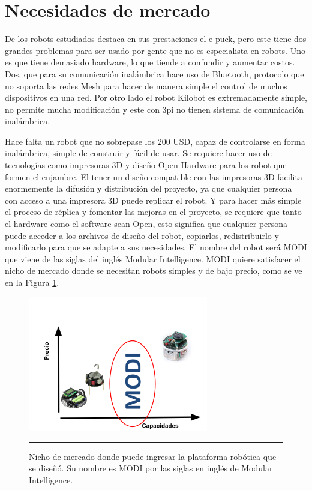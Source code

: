 \section{Necesidades de mercado}

De los robots estudiados destaca en sus prestaciones el e-puck, pero este tiene dos grandes problemas para ser usado por gente que no es especialista en robots. Uno es que tiene demasiado hardware, lo que tiende a confundir y aumentar costos. Dos, que para su comunicación inalámbrica hace uso de Bluetooth, protocolo que no soporta las redes Mesh para hacer de manera simple el control de muchos dispositivos en una red. Por otro lado el robot Kilobot es extremadamente simple, no permite mucha modificación y este con 3pi no tienen sistema de comunicación inalámbrica.

Hace falta un robot que no sobrepase los 200 USD, capaz de controlarse en forma inalámbrica, simple de construir y fácil de usar. Se requiere hacer uso de tecnologías como impresoras 3D y diseño Open Hardware para los robot que formen el enjambre. El tener un diseño compatible con las impresoras 3D facilita enormemente la difusión y distribución del proyecto, ya que cualquier persona con acceso a una impresora 3D puede replicar el robot. Y para hacer más simple el proceso de réplica y fomentar las mejoras en el proyecto, se requiere que tanto el hardware como el software sean Open, esto significa que cualquier persona puede acceder a los archivos de diseño del robot, copiarlos, redistribuirlo y modificarlo para que se adapte a sus necesidades. El nombre del robot será MODI que viene de las siglas del inglés Modular Intelligence. MODI quiere satisfacer el nicho de mercado donde se necesitan robots simples y de bajo precio, como se ve en la Figura \ref{fig:nicho}.

\begin{figure}[htbp]
	\centering
		\includegraphics[width=0.7\textwidth]{./Figures/nicho.png}
		\rule{35em}{0.5pt}
	\caption[Nicho de mercado]{Nicho de mercado donde puede ingresar la plataforma robótica que se diseñó. Su nombre es MODI por las siglas en inglés de Modular Intelligence.}
	\label{fig:nicho}
\end{figure}



